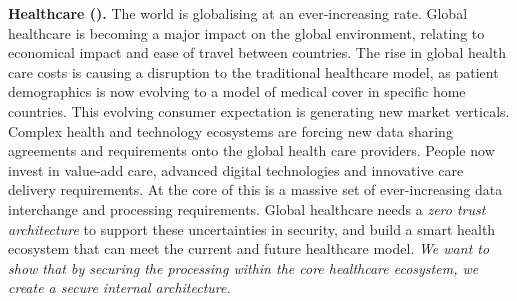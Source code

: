 \begin{Workpackage}{\thewpno}
\begin{Task}

\textbf{Healthcare (\SOPRAshort{}).} The world is globalising at an ever-increasing rate. Global healthcare is becoming a major impact on the global environment, relating to economical impact and ease of travel between countries.  The rise in global health care costs is causing a disruption to the traditional healthcare model, as patient demographics is now evolving to a model of medical cover in specific home countries. This evolving consumer expectation is generating new market verticals. Complex health and technology ecosystems are forcing new data sharing agreements and requirements onto the global health care providers. People now invest in value-add care, advanced digital technologies and innovative care delivery requirements. At the core of this is a massive set of ever-increasing data interchange and processing requirements. Global healthcare needs a \emph{zero trust architecture} to support these uncertainties in security, and build a smart health ecosystem that can meet the current and future healthcare model. \emph{We want to show that by securing the processing within the core healthcare ecosystem, we create a secure internal architecture.}



\end{Task}
\end{Workpackage}

